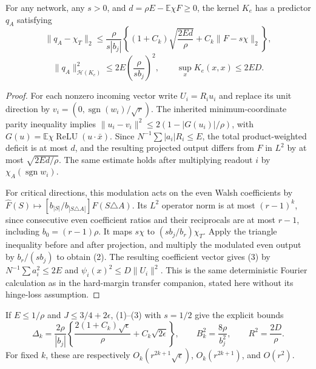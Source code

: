 \documentclass[11pt]{article}
\newcommand{\E}{\mathbb E}\newcommand{\R}{\mathbb R}
\newcommand{\relu}{\operatorname{ReLU}}
\begin{document}
\begin{lemma}
For any network, any $s>0$, and $d=\rho E-\E\chi F\ge0$, the
kernel $K_e$ has a predictor $q_A$ satisfying
\[
 \|q_A-\chi_T\|_2
 \le\frac{\rho}{s|b_j|}
 \left\{(1+C_k)\sqrt{\frac{2Ed}{\rho}}
                         +C_k\|F-s\chi\|_2\right\},     \tag{2}
\]
\[
 \|q_A\|_{\mathcal H(K_e)}^2
       \le2E\left(\frac{\rho}{s b_j}\right)^2,
 \qquad \sup_xK_e(x,x)\le2ED.                           \tag{3}
\]
\end{lemma}
\begin{proof}
For each nonzero incoming vector write $U_i=R_i u_i$ and replace its
unit direction by $v_i=(0,\operatorname{sgn}(w_i)/\sqrt r)$.
The inherited minimum-coordinate parity inequality implies
$\|u_i-v_i\|^2\le2(1-|G(u_i)|/\rho)$, with
$G(u)=\E\chi\relu(u\cdot\bar x)$.
Since $N^{-1}\sum|a_i|R_i\le E$, the total product-weighted deficit
is at most $d$, and the resulting projected output differs from $F$
in $L^2$ by at most $\sqrt{2Ed/\rho}$.
The same estimate holds after multiplying readout $i$ by
$\chi_A(\operatorname{sgn}w_i)$.

For critical directions, this modulation acts on the even Walsh
coefficients by
$\widehat F(S)\mapsto
[b_{|S|}/b_{|S\triangle A|}]\widehat F(S\triangle A)$.
Its $L^2$ operator norm is at most $(r-1)^k$, since consecutive
even coefficient ratios and their reciprocals are at most $r-1$,
including $b_0=(r-1)\rho$.
It maps $s\chi$ to $(s b_j/b_r)\chi_T$.
Apply the triangle inequality before and after projection, and multiply
the modulated even output by $b_r/(s b_j)$ to obtain (2).
The resulting coefficient vector gives (3) by
$N^{-1}\sum a_i^2\le2E$ and
$\psi_i(x)^2\le D\|U_i\|^2$.
This is the same deterministic Fourier calculation as in the hard-margin
transfer companion, stated here without its hinge-loss assumption.
\end{proof}

If $E\le1/\rho$ and $J\le3/4+2\epsilon$, (1)--(3) with $s=1/2$
give the explicit bounds
\[
 \Delta_k=
 \frac{2\rho}{|b_j|}
 \left\{\frac{2(1+C_k)\sqrt\epsilon}{\rho}
                                  +C_k\sqrt{2\epsilon}\right\},
 \qquad B_k^2=\frac{8\rho}{b_j^2},\qquad R^2=\frac{2D}{\rho}.
 \tag{4}
\]
For fixed $k$, these are respectively
$O_k(r^{2k+1}\sqrt\epsilon)$, $O_k(r^{2k+1})$, and $O(r^2)$.
\end{document}
